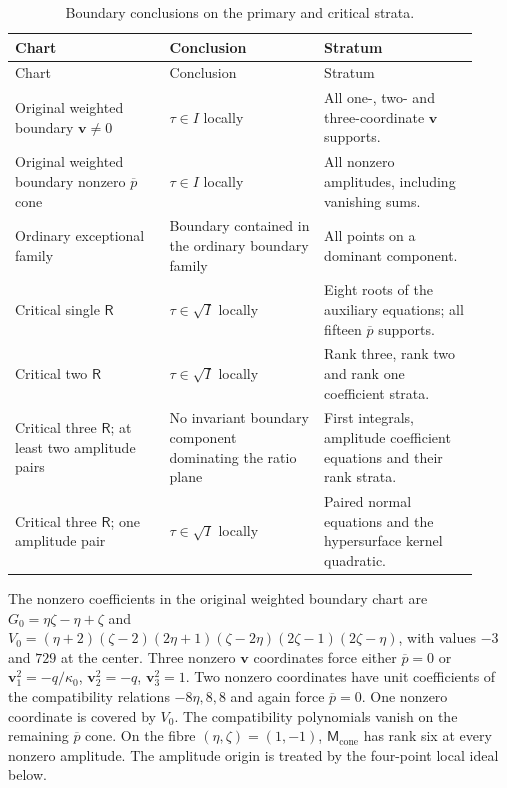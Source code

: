 \documentclass[11pt,a4paper]{article}
\numberwithin{equation}{section}
\theoremstyle{plain}
\theoremstyle{definition}
\theoremstyle{remark}
\begin{document}
\begin{longtable}{@{}p{0.305\linewidth}p{0.305\linewidth}p{0.305\linewidth}@{}}

\caption{Boundary conclusions on the primary and critical strata.}\label{tab:r3-primary-ideals}\\
\toprule Chart & Conclusion & Stratum\\\midrule\endfirsthead
\toprule Chart & Conclusion & Stratum\\\midrule\endhead

Original weighted boundary $\boldsymbol v\ne0$ & $\tau\in I$ locally & All one-, two- and three-coordinate $\boldsymbol v$ supports.\\

Original weighted boundary nonzero $\overline p$ cone & $\tau\in I$ locally & All nonzero amplitudes, including vanishing sums.\\

Ordinary exceptional family & Boundary contained in the ordinary boundary family & All points on a dominant component.\\

Critical single $\mathsf R$ & $\tau\in\sqrt I$ locally & Eight roots of the auxiliary equations; all fifteen $\overline p$ supports.\\

Critical two $\mathsf R$ & $\tau\in\sqrt I$ locally & Rank three, rank two and rank one coefficient strata.\\

Critical three $\mathsf R$; at least two amplitude pairs
 & No invariant boundary component dominating the ratio plane
 & First integrals, amplitude coefficient equations and their rank strata.\\

Critical three $\mathsf R$; one amplitude pair
 & $\tau\in\sqrt I$ locally
 & Paired normal equations and the hypersurface kernel quadratic.\\

\bottomrule\end{longtable}

The nonzero coefficients in the original weighted boundary chart are $G_0=\eta \zeta -\eta +\zeta $ and $V_0=(\eta +2)(\zeta -2)(2\eta +1)(\zeta -2\eta )(2\zeta -1)(2\zeta -\eta )$, with values $-3$ and $729$ at the center. Three nonzero $\boldsymbol v$ coordinates force either $\overline p=0$ or $\boldsymbol v_1^2=-q/\kappa_0 $, $\boldsymbol v_2^2=-q$, $\boldsymbol v_3^2=1$. Two nonzero coordinates have unit coefficients of the compatibility relations $-8\eta ,8,8$ and again force $\overline p=0$. One nonzero coordinate is covered by $V_0$.
The compatibility polynomials vanish on the remaining $\overline p$ cone.
On the fibre $(\eta,\zeta)=(1,-1)$, $\mathsf M_{\mathrm{cone}}$ has rank six at every
nonzero amplitude. The amplitude origin is treated by the four-point
local ideal below.
\end{document}
